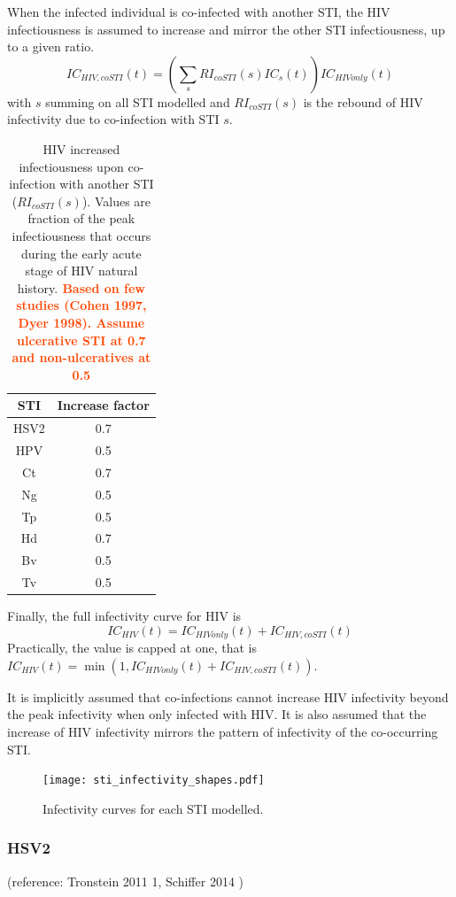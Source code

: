 \documentclass[11pt, onecolumn]{article}
\newcommand{\warning}[1]{\textbf{\textcolor{OrangeRed}{#1}}}
\begin{document}
When the infected individual is co-infected with another STI, the HIV infectiousness is assumed to increase and mirror the other STI infectiousness, up to a given ratio.
$$IC_{HIV,coSTI}(t) = \left(\sum_s RI_{coSTI}(s) IC_{s}(t)\right)  IC_{HIVonly}(t) $$
with $s$ summing on all STI modelled and $RI_{coSTI}(s)$ is the rebound of HIV infectivity due to co-infection with STI $s$.

\begin{table}[htdp]
\begin{center}
\begin{tabular}{|c|c|}
\hline
STI & Increase factor \\
\hline
HSV2 & 0.7\\
HPV & 0.5\\
Ct & 0.7\\
Ng & 0.5\\
Tp & 0.5\\
Hd & 0.7\\
Bv & 0.5\\
Tv & 0.5\\
\hline
\end{tabular}
\end{center}
\caption{HIV increased infectiousness upon co-infection with another STI ($RI_{coSTI}(s)$). Values are fraction of the peak infectiousness that occurs during the early acute stage of HIV natural history.\warning{ Based on few studies (Cohen 1997, Dyer 1998). Assume ulcerative STI at 0.7 and non-ulceratives at 0.5}}
\label{Table:rebound}
\end{table}%



Finally, the full infectivity curve for HIV is
$$ IC_{HIV}(t) = IC_{HIVonly}(t)+IC_{HIV,coSTI}(t)$$
Practically, the value is capped at one, that is $ IC_{HIV}(t) = \min(1,IC_{HIVonly}(t)+IC_{HIV,coSTI}(t))$. 

It is implicitly assumed that co-infections cannot increase HIV infectivity beyond the peak infectivity when only infected with HIV. It is also assumed that the increase of HIV infectivity mirrors the pattern of infectivity of the co-occurring STI.

\begin{figure}[!ht]
\centering
    \texttt{[image: sti\_infectivity\_shapes.pdf]}
\caption{Infectivity curves for each STI modelled.}
\label{fig:InfectivityCurves}
\end{figure}


\subsubsection{HSV2}
(reference: Tronstein 2011 1, Schiffer 2014 \cite{xxx})
\end{document}
